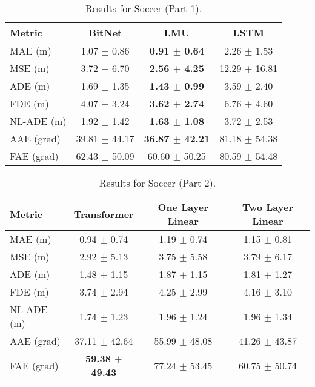 \begin{table}[H]
\centering
\caption{Results for Soccer (Part 1).}
\label{init: SOC1}
\begin{tabular}{l||c|c|c}
Metric & BitNet & LMU & LSTM \\
\hline \hline
MAE (m) & 1.07 $\pm$ 0.86 & \textbf{0.91 $\pm$ 0.64} & 2.26 $\pm$ 1.53 \\
MSE (m) & 3.72 $\pm$ 6.70 & \textbf{2.56 $\pm$ 4.25} & 12.29 $\pm$ 16.81 \\
ADE (m) & 1.69 $\pm$ 1.35 & \textbf{1.43 $\pm$ 0.99} & 3.59 $\pm$ 2.40 \\
FDE (m) & 4.07 $\pm$ 3.24 & \textbf{3.62 $\pm$ 2.74} & 6.76 $\pm$ 4.60 \\
NL-ADE (m) & 1.92 $\pm$ 1.42 & \textbf{1.63 $\pm$ 1.08} & 3.72 $\pm$ 2.53 \\
AAE (grad) & 39.81 $\pm$ 44.17 & \textbf{36.87 $\pm$ 42.21} & 81.18 $\pm$ 54.38 \\
FAE (grad) & 62.43 $\pm$ 50.09 & 60.60 $\pm$ 50.25 & 80.59 $\pm$ 54.48 \\
\end{tabular}
\end{table}

\begin{table}[H]
\centering
\caption{Results for Soccer (Part 2).}
\label{init: SOC2}
\begin{tabular}{l||c|c|c}
Metric & Transformer & One Layer Linear & Two Layer Linear \\
\hline \hline
MAE (m) & 0.94 $\pm$ 0.74 & 1.19 $\pm$ 0.74 & 1.15 $\pm$ 0.81 \\
MSE (m) & 2.92 $\pm$ 5.13 & 3.75 $\pm$ 5.58 & 3.79 $\pm$ 6.17 \\
ADE (m) & 1.48 $\pm$ 1.15 & 1.87 $\pm$ 1.15 & 1.81 $\pm$ 1.27 \\
FDE (m) & 3.74 $\pm$ 2.94 & 4.25 $\pm$ 2.99 & 4.16 $\pm$ 3.10 \\
NL-ADE (m) & 1.74 $\pm$ 1.23 & 1.96 $\pm$ 1.24 & 1.96 $\pm$ 1.34 \\
AAE (grad) & 37.11 $\pm$ 42.64 & 55.99 $\pm$ 48.08 & 41.26 $\pm$ 43.87 \\
FAE (grad) & \textbf{59.38 $\pm$ 49.43} & 77.24 $\pm$ 53.45 & 60.75 $\pm$ 50.74 \\
\end{tabular}
\end{table}


